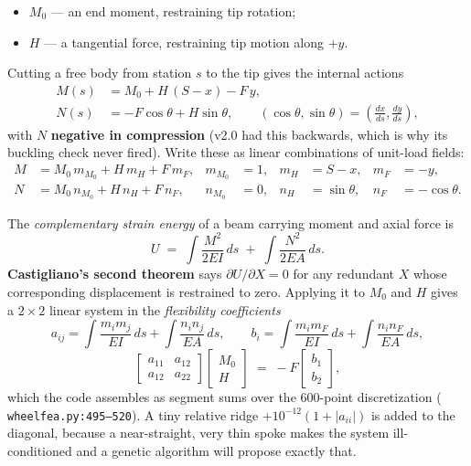 \documentclass[11pt,a4paper]{article}
\DeclareRobustCommand{\code}[1]{%
  \texttt{\small\def\_{\textunderscore\discretionary{}{}{}}#1}}
\newcommand{\at}[2]{\code{#1:#2}}
\begin{document}
\begin{itemize}
\item $M_0$ --- an end moment, restraining tip rotation;
\item $H$ --- a tangential force, restraining tip motion along $+y$.
\end{itemize}

Cutting a free body from station $s$ to the tip gives the internal actions
%
\begin{align}
  M(s) &= M_0 + H\,(S - x) - F\,y, \\
  N(s) &= -F\cos\theta + H\sin\theta,
  \qquad (\cos\theta, \sin\theta) = \left(\tfrac{dx}{ds}, \tfrac{dy}{ds}\right),
\end{align}
%
with $N$ \textbf{negative in compression} (v2.0 had this backwards, which is why its
buckling check never fired). Write these as linear combinations of unit-load fields:
%
\begin{align}
  M &= M_0\,m_{M_0} + H\,m_H + F\,m_F, &
      m_{M_0} &= 1, & m_H &= S - x, & m_F &= -y,\\
  N &= M_0\,n_{M_0} + H\,n_H + F\,n_F, &
      n_{M_0} &= 0, & n_H &= \sin\theta, & n_F &= -\cos\theta.
\end{align}

The \emph{complementary strain energy} of a beam carrying moment and axial force is
%
\begin{equation}
  U \;=\; \int \frac{M^2}{2EI}\,ds \;+\; \int \frac{N^2}{2EA}\,ds .
\end{equation}
%
\textbf{Castigliano's second theorem} says $\partial U/\partial X = 0$ for any redundant
$X$ whose corresponding displacement is restrained to zero. Applying it to $M_0$ and
$H$ gives a $2\times2$ linear system in the \emph{flexibility coefficients}
%
\begin{equation}
  a_{ij} = \int \frac{m_i m_j}{EI}\,ds + \int \frac{n_i n_j}{EA}\,ds,
  \qquad
  b_{i}  = \int \frac{m_i m_F}{EI}\,ds + \int \frac{n_i n_F}{EA}\,ds,
\end{equation}
%
\begin{equation}
  \begin{bmatrix} a_{11} & a_{12} \\ a_{12} & a_{22} \end{bmatrix}
  \begin{bmatrix} M_0 \\ H \end{bmatrix}
  \;=\; -F \begin{bmatrix} b_1 \\ b_2 \end{bmatrix},
  \label{eq:flexibility}
\end{equation}
%
which the code assembles as segment sums over the 600-point discretization
(\at{wheel\_fea.py}{495--520}). A tiny relative ridge $+10^{-12}(1 + |a_{ii}|)$ is added
to the diagonal, because a near-straight, very thin spoke makes the system
ill-conditioned and a genetic algorithm will propose exactly that.
\end{document}
